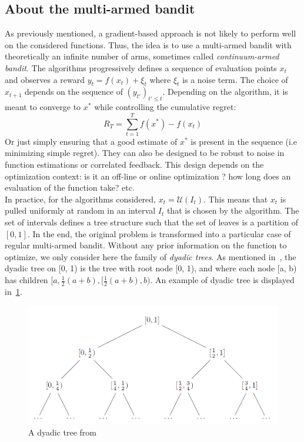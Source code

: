 \documentclass[a4paper,10pt]{article}
\begin{document}
\subsection{About the multi-armed bandit}
\label{mab}
As previously mentioned, a gradient-based approach is not likely to perform well on the considered functions. Thus, the idea is to use a multi-armed bandit with theoretically an infinite number of arms, sometimes called \textit{continuum-armed bandit}. The algorithms progressively defines a sequence of evaluation points $x_t$ and observes a reward $y_t=f(x_t)+\xi_t$ where $\xi_t$ is a noise term. The choice of $x_{t+1}$ depends on the sequence of $(y_{t'})_{t'\le t}$. Depending on the algorithm, it is meant to converge to $x^*$ while controlling the cumulative regret:
\begin{equation}
\label{regret}
R_T = \underset{t=1}{\overset{T}{\sum}}f(x^*)-f(x_t)
\end{equation}
Or just simply ensuring that a good estimate of $x^*$ is present in the sequence (i.e minimizing simple regret). They can also be designed to be robust to noise in function estimations or correlated feedback. This design depends on the optimization context: is it an off-line or online optimization ? how long does an evaluation of the function take? etc.\\
In practice, for the algorithms considered, $x_t = \mathcal{U}(I_t)$. This means that $x_t$ is pulled uniformly at random in an interval $I_t$ that is chosen by the algorithm. The set of intervals defines a tree structure such that the set of leaves is a partition of $[0,1]$. In the end, the original problem is transformed into a particular case of regular multi-armed bandit. Without any prior information on the function to optimize, we only consider here the family of \textit{dyadic trees}. As mentioned in~\cite{bull2013adaptive}, the dyadic tree on [0, 1) is the tree with root node [0, 1), and where each node [a, b) has children $[a, \frac{1}{2}(a+b), [ \frac{1}{2}(a+b), b)$. An example of dyadic tree is displayed in~\ref{dydtree}. 

\begin{figure}
\label{dydtree}
\centering
\includegraphics[scale=0.3]{dyadic}
\caption{A dyadic tree from~\cite{bull2013adaptive}}
\end{figure}
\end{document}
